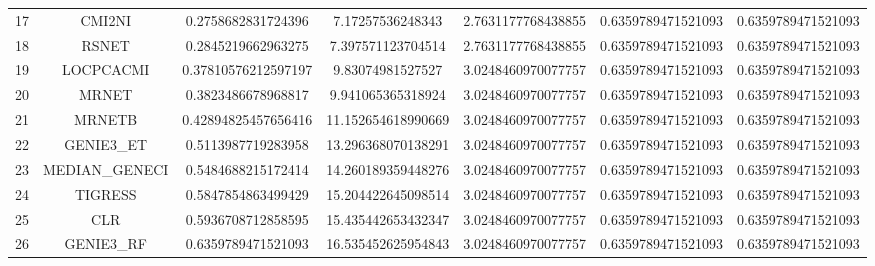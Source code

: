 \documentclass[a4paper,10pt]{article}
\begin{document}
\begin{landscape}
\begin{table}[!htp]
\begin{tabular}{ccccccc}
17&CMI2NI&0.2758682831724396&7.17257536248343&2.7631177768438855&0.6359789471521093&0.6359789471521093\\
18&RSNET&0.2845219662963275&7.397571123704514&2.7631177768438855&0.6359789471521093&0.6359789471521093\\
19&LOCPCACMI&0.37810576212597197&9.83074981527527&3.0248460970077757&0.6359789471521093&0.6359789471521093\\
20&MRNET&0.3823486678968817&9.941065365318924&3.0248460970077757&0.6359789471521093&0.6359789471521093\\
21&MRNETB&0.42894825457656416&11.152654618990669&3.0248460970077757&0.6359789471521093&0.6359789471521093\\
22&GENIE3_ET&0.5113987719283958&13.296368070138291&3.0248460970077757&0.6359789471521093&0.6359789471521093\\
23&MEDIAN_GENECI&0.5484688215172414&14.260189359448276&3.0248460970077757&0.6359789471521093&0.6359789471521093\\
24&TIGRESS&0.5847854863499429&15.204422645098514&3.0248460970077757&0.6359789471521093&0.6359789471521093\\
25&CLR&0.5936708712858595&15.435442653432347&3.0248460970077757&0.6359789471521093&0.6359789471521093\\
26&GENIE3_RF&0.6359789471521093&16.535452625954843&3.0248460970077757&0.6359789471521093&0.6359789471521093\\
\hline
\end{tabular}
\end{table}


\end{landscape}
\end{document}
